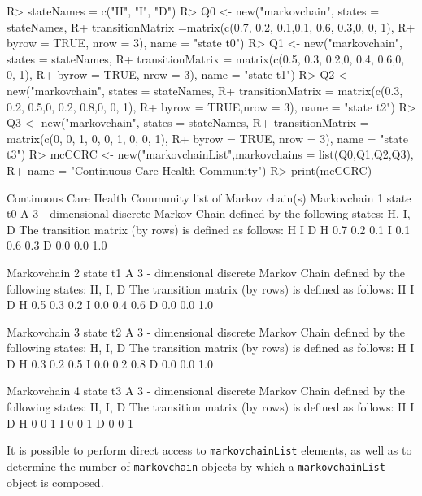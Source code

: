 \documentclass[article,nojss]{jss}
\begin{document}
\begin{CodeChunk}

\begin{CodeInput}
R> stateNames = c("H", "I", "D")
R> Q0 <- new("markovchain", states = stateNames, 
R+         transitionMatrix =matrix(c(0.7, 0.2, 0.1,0.1, 0.6, 0.3,0, 0, 1), 
R+         byrow = TRUE, nrow = 3), name = "state t0")
R> Q1 <- new("markovchain", states = stateNames, 
R+         transitionMatrix = matrix(c(0.5, 0.3, 0.2,0, 0.4, 0.6,0, 0, 1), 
R+         byrow = TRUE, nrow = 3), name = "state t1")
R> Q2 <- new("markovchain", states = stateNames, 
R+         transitionMatrix = matrix(c(0.3, 0.2, 0.5,0, 0.2, 0.8,0, 0, 1), 
R+         byrow = TRUE,nrow = 3), name = "state t2")
R> Q3 <- new("markovchain", states = stateNames, 
R+           transitionMatrix = matrix(c(0, 0, 1, 0, 0, 1, 0, 0, 1), 
R+         byrow = TRUE, nrow = 3), name = "state t3")
R> mcCCRC <- new("markovchainList",markovchains = list(Q0,Q1,Q2,Q3), 
R+       name = "Continuous Care Health Community")
R> print(mcCCRC)
\end{CodeInput}

\begin{CodeOutput}
Continuous Care Health Community  list of Markov chain(s) 
Markovchain  1 
state t0 
 A  3 - dimensional discrete Markov Chain defined by the following states: 
 H, I, D 
 The transition matrix  (by rows)  is defined as follows: 
    H   I   D
H 0.7 0.2 0.1
I 0.1 0.6 0.3
D 0.0 0.0 1.0

Markovchain  2 
state t1 
 A  3 - dimensional discrete Markov Chain defined by the following states: 
 H, I, D 
 The transition matrix  (by rows)  is defined as follows: 
    H   I   D
H 0.5 0.3 0.2
I 0.0 0.4 0.6
D 0.0 0.0 1.0

Markovchain  3 
state t2 
 A  3 - dimensional discrete Markov Chain defined by the following states: 
 H, I, D 
 The transition matrix  (by rows)  is defined as follows: 
    H   I   D
H 0.3 0.2 0.5
I 0.0 0.2 0.8
D 0.0 0.0 1.0

Markovchain  4 
state t3 
 A  3 - dimensional discrete Markov Chain defined by the following states: 
 H, I, D 
 The transition matrix  (by rows)  is defined as follows: 
  H I D
H 0 0 1
I 0 0 1
D 0 0 1
\end{CodeOutput}
\end{CodeChunk}

It is possible to perform direct access to \texttt{markovchainList} elements, as well as to determine the number of \texttt{markovchain} objects by which a \texttt{markovchainList} object is composed.
\end{document}
